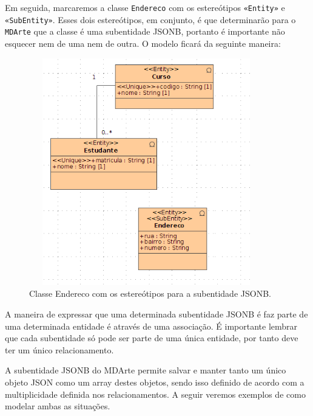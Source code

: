 Em seguida, marcaremos a classe \texttt{Endereco} com os estereótipos
\texttt{«Entity»} e \texttt{«SubEntity»}. Esses dois estereótipos, em conjunto,
é que determinarão para o \texttt{MDArte} que a classe é uma subentidade JSONB,
portanto é importante não esquecer nem de uma nem de outra. O modelo ficará da
seguinte maneira:

\begin{figure}[H]
	\centering
	\includegraphics[width=290pt,height=280pt]{files/imgs/tutorial-mdarte-jsonb-0002.png}
	\caption{Classe Endereco com os estereótipos para a subentidade JSONB.}
	\label{camada_dominio_endereco_estereotipos}
\end{figure}

A maneira de expressar que uma determinada subentidade JSONB é faz parte de uma
determinada entidade é através de uma associação. É importante lembrar que cada
subentidade só pode ser parte de uma única entidade, por tanto deve ter um único
relacionamento.

A subentidade JSONB do MDArte permite salvar e manter tanto um único objeto JSON
como um array destes objetos, sendo isso definido de acordo com a
multiplicidade definida nos relacionamentos. A seguir veremos exemplos de como
modelar ambas as situações.


